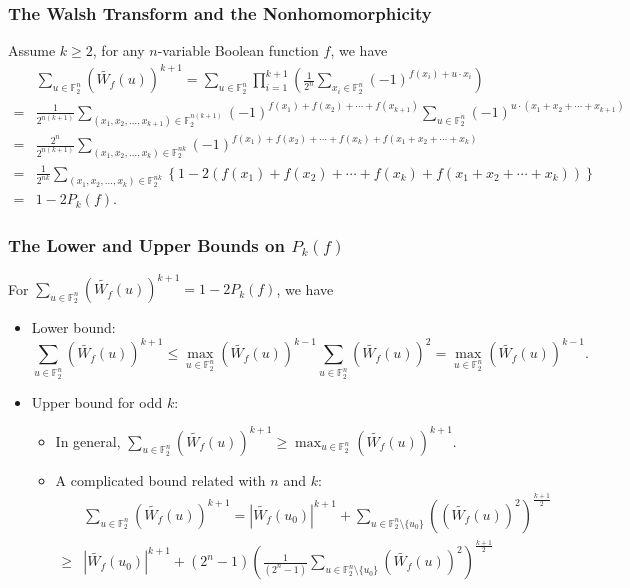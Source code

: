 \documentclass[
    aspectratio=169,                   %
]{beamer}
\newcommand{\F}{\mathbb{F}}
\begin{document}
    \begin{frame}
        \frametitle{The Walsh Transform and the Nonhomomorphicity}
        
        Assume $k\ge 2$, for any $n$-variable Boolean function $f$, we have 
        \begin{align*}
            &\sum_{u\in\F_2^n}^{}\left( \widetilde{W_f}(u) \right)^{k+1}=\sum_{u\in\F_2^n}\prod_{i=1}^{k+1}\left( \frac{1}{2^n}\sum_{x_i\in\F_2^n}(-1)^{f(x_i)+u\cdot x_i} \right)\\
            =&\frac{1}{2^{n(k+1)}}\sum_{(x_1,x_2,...,x_{k+1})\in\F_2^{n(k+1)}}^{}(-1)^{f(x_1)+f(x_2)+\cdots+f(x_{k+1})}\sum_{u\in\F_2^n}^{}(-1)^{u\cdot(x_1+x_2+\cdots+x_{k+1})}\\ 
            =&\frac{2^n}{2^{n(k+1)}}\sum_{(x_1,x_2,...,x_{k})\in\F_2^{nk}}^{}(-1)^{f(x_1)+f(x_2)+\cdots+f(x_{k})+f(x_1+x_2+\cdots+x_k)}\\
            =&\frac{1}{2^{nk}}\sum_{(x_1,x_2,...,x_{k})\in\F_2^{nk}}^{}\left\{ 1-2(f(x_1)+f(x_2)+\cdots+f(x_{k})+f(x_1+x_2+\cdots+x_k)) \right\}\\
            =&1-2P_{k}(f).
        \end{align*}
    \end{frame}
    


    \begin{frame}
        \frametitle{The Lower and Upper Bounds on $P_k(f)$}
        For $\sum_{u\in\F_2^n}^{}\left( \widetilde{W_f}(u) \right)^{k+1}=1-2P_{k}(f)$, we have 
        \begin{itemize}
            \item Lower bound:
            \[\sum_{u\in\F_2^n}^{}\left( \widetilde{W_f}(u) \right)^{k+1}\le\max_{u\in\F_2^n}\left( \widetilde{W_f}(u) \right)^{k-1}\sum_{u\in\F_2^n}^{}\left( \widetilde{W_f}(u) \right)^2=\max_{u\in\F_2^n}\left( \widetilde{W_f}(u) \right)^{k-1}. \]
            \item Upper bound for odd $k$:
            \begin{itemize}
                \item In general, $\sum_{u\in\F_2^n}^{}\left( \widetilde{W_f}(u) \right)^{k+1}\ge \max_{u\in\F_2^n}\left( \widetilde{W_f}(u) \right)^{k+1}$.
                \item A complicated bound related with $n$ and $k$:
                \begin{align*}
                    &\sum_{u\in\F_2^n}^{}\left( \widetilde{W_f}(u) \right)^{k+1}=\left| \widetilde{W_f}(u_0) \right|^{k+1}+\sum_{u\in\F_2^n\setminus\{u_0\}}\left( \left( \widetilde{W_f}(u) \right)^2 \right)^{\frac{k+1}{2}}\\
                    \ge&\left| \widetilde{W_f}(u_0) \right|^{k+1}+(2^n-1)\left( \frac{1}{(2^n-1)}\sum_{u\in\F_2^n\setminus\{u_0\}}\left( \widetilde{W_f}(u) \right)^2 \right)^{\frac{k+1}{2}}
                \end{align*}
            \end{itemize}
        \end{itemize}
    \end{frame}
\end{document}
